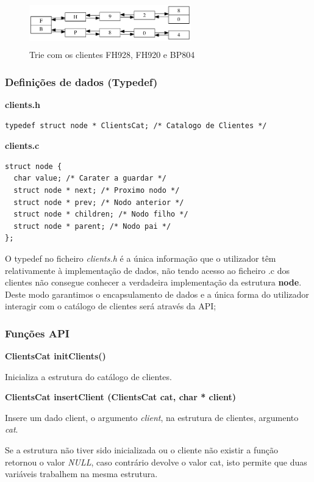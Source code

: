 \documentclass[10pt] {article}
\begin{document}
\begin{figure}[ht!]
\centering
\includegraphics[width=70mm, height=20mm]{trie.png}
\caption{Trie com os clientes FH928, FH920 e BP804}
\end{figure}

\subsubsection{Definições de dados (Typedef)}

\noindent\textbf{clients.h}
\begin{lstlisting}
typedef struct node * ClientsCat; /* Catalogo de Clientes */
\end{lstlisting}
\textbf{clients.c}
\begin{lstlisting}
struct node {
  char value; /* Carater a guardar */
  struct node * next; /* Proximo nodo */
  struct node * prev; /* Nodo anterior */
  struct node * children; /* Nodo filho */
  struct node * parent; /* Nodo pai */
};
\end{lstlisting}
\par {O typedef no ficheiro \emph{clients.h} é a única informação que o utilizador têm relativamente à implementação
de dados, não tendo  acesso ao ficheiro .c dos clientes não consegue conhecer a verdadeira implementação da
estrutura \textbf{node}. Deste modo garantimos o encapsulamento de dados e a única forma do utilizador interagir
com o catálogo de clientes será através da API;} \\

\subsubsection{Funções API}

\noindent\textbf{ClientsCat initClients()}
\par Inicializa a estrutura do catálogo de clientes.

\noindent\textbf{ClientsCat insertClient (ClientsCat cat, char * client)}
\par Insere um dado client, o argumento \emph{client}, na estrutura de clientes, argumento \emph{cat}.
\par Se a estrutura não tiver sido inicializada ou o cliente não existir a função retornou o valor \emph{NULL},
caso contrário devolve o valor cat, isto permite que duas variáveis trabalhem na mesma estrutura. \\
\end{document}
